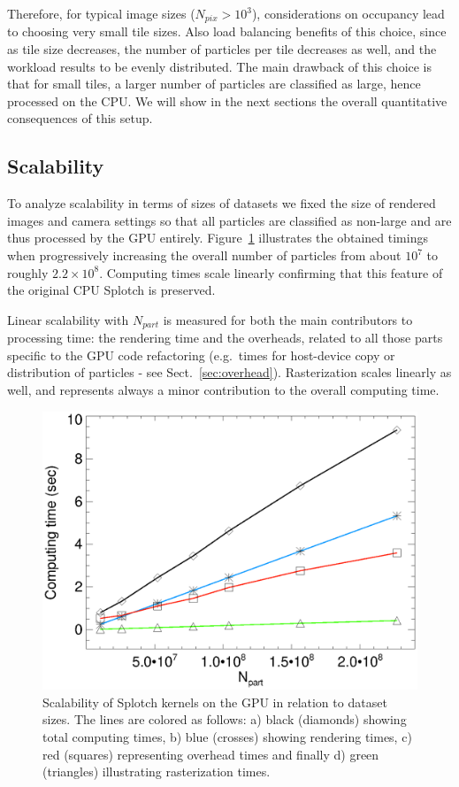 \documentclass[preprint,5pt]{elsarticle}
\begin{document}
Therefore, for typical image sizes ($N_{pix} > 10^3$), considerations on occupancy lead to choosing  very small tile sizes. Also load balancing benefits of this choice, since as tile size decreases, the number of particles per tile decreases as well, and the workload results to be evenly distributed.
The main drawback of this choice is that for small tiles, a larger number of particles are classified as large, hence processed on the CPU. We will show in the next sections the overall quantitative consequences of this setup.  

\subsection{Scalability}
\label{sec:scalability}
To analyze scalability in terms of sizes of datasets we fixed the size of rendered images and camera settings so that all particles are classified as non-large and are thus processed by the GPU entirely. 
Figure~\ref{fig:scalability} illustrates the obtained timings when progressively increasing the overall number of particles
from about $10^7$ to roughly $2.2\times10^8$. Computing times scale linearly confirming that this feature of the original CPU Splotch is preserved. 

Linear scalability with $N_{part}$ is measured for both the main contributors to processing time: the rendering time and the overheads, related to all those parts specific to the GPU code refactoring (e.g.\ times for host-device copy or distribution of particles - see Sect.~\ref{sec:overhead}).
Rasterization scales linearly as well, and represents always a minor contribution to the overall computing time.   

\begin{figure}
\includegraphics[scale=0.5]{scala-fig3K20.eps}
\caption{Scalability of Splotch kernels on the GPU in relation to dataset sizes. 
The lines are colored as follows: a) black (diamonds) showing total computing times, b) blue (crosses) showing rendering times, c) red (squares) representing overhead times and finally d) green (triangles) illustrating rasterization times.}
\label{fig:scalability}
\end{figure}
 
\end{document}
